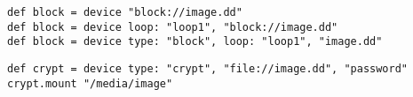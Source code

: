\begin{lstlisting}[style=Groovybash, label={lst:example_device2}, title={
Creates a loop device for the image file.}]
def block = device "block://image.dd"
def block = device loop: "loop1", "block://image.dd"
def block = device type: "block", loop: "loop1", "image.dd"
\end{lstlisting}

\begin{lstlisting}[style=Groovybash, label={lst:example_device3}, title={
Passing of arguments to the created device.}]
def crypt = device type: "crypt", "file://image.dd", "password"
crypt.mount "/media/image"
\end{lstlisting}

